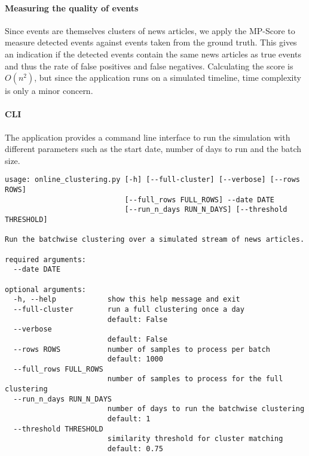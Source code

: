 \paragraph{Measuring the quality of events} 
Since events are themselves clusters of news articles, we apply the MP-Score to measure detected events against events taken from the ground truth. This gives an indication if the detected events contain the same news articles as true events and thus the rate of false positives and false negatives. Calculating the score is $O(n^2)$, but since the application runs on a simulated timeline, time complexity is only a minor concern. 

\paragraph{CLI} The application provides a command line interface to run the simulation with different parameters such as the start date, number of days to run and the batch size.

\begin{lstlisting}[caption=Command line interface for the online clustering, label={lst:cli_online_clustering}]
    usage: online_clustering.py [-h] [--full-cluster] [--verbose] [--rows ROWS]
                            [--full_rows FULL_ROWS] --date DATE
                            [--run_n_days RUN_N_DAYS] [--threshold THRESHOLD]

Run the batchwise clustering over a simulated stream of news articles.

required arguments:
  --date DATE           

optional arguments:
  -h, --help            show this help message and exit
  --full-cluster        run a full clustering once a day
                        default: False
  --verbose             
                        default: False
  --rows ROWS           number of samples to process per batch
                        default: 1000
  --full_rows FULL_ROWS
                        number of samples to process for the full clustering
  --run_n_days RUN_N_DAYS
                        number of days to run the batchwise clustering
                        default: 1
  --threshold THRESHOLD
                        similarity threshold for cluster matching
                        default: 0.75

\end{lstlisting}


